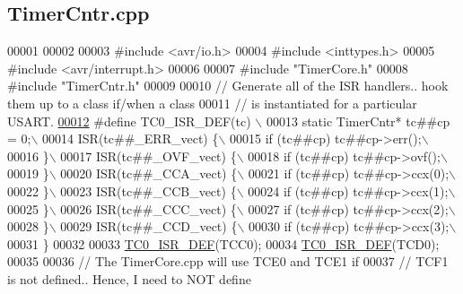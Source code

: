 \hypertarget{_timer_cntr_8cpp_source}{
\subsection{TimerCntr.cpp}
}

\begin{DoxyCode}
00001 
00002 
00003 \textcolor{preprocessor}{#include <avr/io.h>}
00004 \textcolor{preprocessor}{#include <inttypes.h>}
00005 \textcolor{preprocessor}{#include <avr/interrupt.h>}
00006 
00007 \textcolor{preprocessor}{#include "TimerCore.h"}
00008 \textcolor{preprocessor}{#include "TimerCntr.h"}
00009 
00010 \textcolor{comment}{// Generate all of the ISR handlers.. hook them up to a class if/when a class}
00011 \textcolor{comment}{// is instantiated for a particular USART.}
\hypertarget{_timer_cntr_8cpp_source_l00012}{}\hyperlink{_timer_cntr_8cpp_a75b8174278ebbbe181f64d2fa6853ddf}{00012} \textcolor{preprocessor}{#define TC0\_ISR\_DEF(tc) \(\backslash\)}
00013 \textcolor{preprocessor}{static TimerCntr*  tc##cp = 0;\(\backslash\)}
00014 \textcolor{preprocessor}{ISR(tc##\_ERR\_vect) \{\(\backslash\)}
00015 \textcolor{preprocessor}{    if (tc##cp) tc##cp->err();\(\backslash\)}
00016 \textcolor{preprocessor}{\}\(\backslash\)}
00017 \textcolor{preprocessor}{ISR(tc##\_OVF\_vect) \{\(\backslash\)}
00018 \textcolor{preprocessor}{    if (tc##cp) tc##cp->ovf();\(\backslash\)}
00019 \textcolor{preprocessor}{\}\(\backslash\)}
00020 \textcolor{preprocessor}{ISR(tc##\_CCA\_vect) \{\(\backslash\)}
00021 \textcolor{preprocessor}{    if (tc##cp) tc##cp->ccx(0);\(\backslash\)}
00022 \textcolor{preprocessor}{\}\(\backslash\)}
00023 \textcolor{preprocessor}{ISR(tc##\_CCB\_vect) \{\(\backslash\)}
00024 \textcolor{preprocessor}{    if (tc##cp) tc##cp->ccx(1);\(\backslash\)}
00025 \textcolor{preprocessor}{\}\(\backslash\)}
00026 \textcolor{preprocessor}{ISR(tc##\_CCC\_vect) \{\(\backslash\)}
00027 \textcolor{preprocessor}{    if (tc##cp) tc##cp->ccx(2);\(\backslash\)}
00028 \textcolor{preprocessor}{\}\(\backslash\)}
00029 \textcolor{preprocessor}{ISR(tc##\_CCD\_vect) \{\(\backslash\)}
00030 \textcolor{preprocessor}{    if (tc##cp) tc##cp->ccx(3);\(\backslash\)}
00031 \textcolor{preprocessor}{\}}
00032 \textcolor{preprocessor}{}
00033 \hyperlink{_timer_cntr_8cpp_a75b8174278ebbbe181f64d2fa6853ddf}{TC0_ISR_DEF}(TCC0);
00034 \hyperlink{_timer_cntr_8cpp_a75b8174278ebbbe181f64d2fa6853ddf}{TC0_ISR_DEF}(TCD0);
00035 
00036 \textcolor{comment}{// The TimerCore.cpp will use TCE0 and TCE1 if}
00037 \textcolor{comment}{// TCF1 is not defined.. Hence, I need to NOT define}

\end{DoxyCode}

